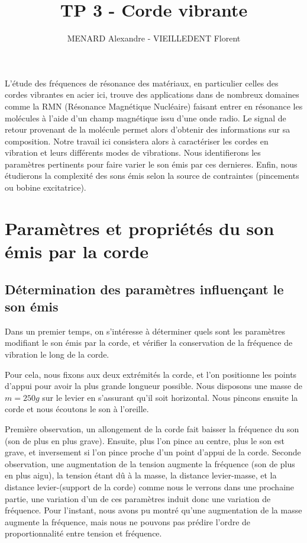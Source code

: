 \documentclass[12pt]{article}
\title{\vspace{-2cm}\textbf{TP 3 - Corde vibrante}}
\author{\vspace{-0.5cm}MENARD Alexandre - VIEILLEDENT Florent}
\date{\vspace{-0.7cm}}
\begin{document}
\maketitle

L'étude des fréquences de résonance des matériaux, en particulier celles des cordes vibrantes en acier ici, trouve des applications dans de nombreux domaines 
comme la RMN (Résonance Magnétique Nucléaire) faisant entrer en résonance les molécules à l'aide d'un champ magnétique issu d'une onde radio. Le signal de retour provenant
de la molécule permet alors d'obtenir des informations sur sa composition. 
Notre travail ici consistera alors à caractériser les cordes en vibration et leurs différents modes de vibrations. Nous identifierons les paramètres pertinents pour faire
varier le son émis par ces dernieres. Enfin, nous étudierons la complexité des sons émis selon la source de contraintes (pincements ou bobine excitatrice).

\section{Paramètres et propriétés du son émis par la corde}
\subsection{Détermination des paramètres influençant le son émis}

Dans un premier temps, on s'intéresse à déterminer quels sont les paramètres modifiant le son émis par la corde, et vérifier la conservation de la fréquence 
de vibration le long de la corde.

Pour cela, nous fixons aux deux extrémités la corde, et l'on positionne les points d'appui pour avoir la plus grande longueur possible. Nous disposons une masse de $m=250g$ sur le levier
en s'assurant qu'il soit horizontal. Nous pincons ensuite la corde et nous écoutons le son à l'oreille.

Première observation, un allongement de la corde fait baisser la fréquence du son (son de plus en plus grave). Ensuite, plus l'on pince au centre, plus le son est grave, et inversement si l'on
pince proche d'un point d'appui de la corde.
Seconde observation, une augmentation de la tension augmente la fréquence (son de plus en plus aigu), la tension étant dû à la masse, la distance levier-masse, et la distance
levier-(support de la corde) comme nous le verrons dans une prochaine partie, une variation d'un de ces paramètres induit donc une variation de fréquence. Pour l'instant, 
nous avons pu montré qu'une augmentation de la masse augmente la fréquence, mais nous ne pouvons pas prédire l'ordre de proportionnalité entre tension et fréquence.
\end{document}
